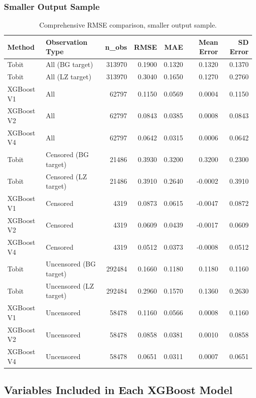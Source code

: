 \documentclass{article}
\begin{document}
\subsubsection{Smaller Output Sample}

\begin{table}[H]
\centering
\small
\begin{tabular}{llrrrrr}
\toprule
Method & Observation Type & n\_obs & RMSE & MAE & Mean Error & SD Error \\
\midrule
Tobit & All (BG target) & 313970 & 0.1900 & 0.1320 & 0.1320 & 0.1370 \\
Tobit & All (LZ target) & 313970 & 0.3040 & 0.1650 & 0.1270 & 0.2760 \\
XGBoost V1 & All & 62797 & 0.1150 & 0.0569 & 0.0004 & 0.1150 \\
XGBoost V2 & All & 62797 & 0.0843 & 0.0385 & 0.0008 & 0.0843 \\
XGBoost V4 & All & 62797 & 0.0642 & 0.0315 & 0.0006 & 0.0642 \\
Tobit & Censored (BG target) & 21486 & 0.3930 & 0.3200 & 0.3200 & 0.2300 \\
Tobit & Censored (LZ target) & 21486 & 0.3910 & 0.2640 & -0.0002 & 0.3910 \\
XGBoost V1 & Censored & 4319 & 0.0873 & 0.0615 & -0.0047 & 0.0872 \\
XGBoost V2 & Censored & 4319 & 0.0609 & 0.0439 & -0.0017 & 0.0609 \\
XGBoost V4 & Censored & 4319 & 0.0512 & 0.0373 & -0.0008 & 0.0512 \\
Tobit & Uncensored (BG target) & 292484 & 0.1660 & 0.1180 & 0.1180 & 0.1160 \\
Tobit & Uncensored (LZ target) & 292484 & 0.2960 & 0.1570 & 0.1360 & 0.2630 \\
XGBoost V1 & Uncensored & 58478 & 0.1160 & 0.0566 & 0.0008 & 0.1160 \\
XGBoost V2 & Uncensored & 58478 & 0.0858 & 0.0381 & 0.0010 & 0.0858 \\
XGBoost V4 & Uncensored & 58478 & 0.0651 & 0.0311 & 0.0007 & 0.0651 \\
\bottomrule
\end{tabular}
\caption{Comprehensive RMSE comparison, smaller output sample.}
\label{tab:comprehensive_rmse_small}
\end{table}

\subsection{Variables Included in Each XGBoost Model}
\end{document}
